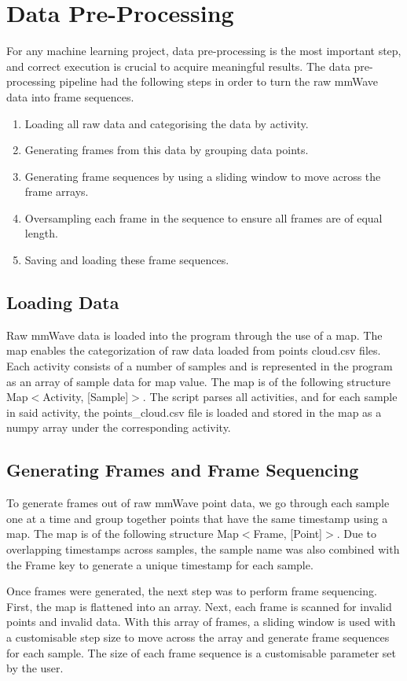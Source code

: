 \section{Data Pre-Processing}
For any machine learning project, data pre-processing is the most important step, and correct execution is crucial to acquire meaningful results. The data pre-processing pipeline had the following steps in order to turn the raw mmWave data into frame sequences.
\begin{enumerate}
    \item Loading all raw data and categorising the data by activity.
    \item Generating frames from this data by grouping data points.
    \item Generating frame sequences by using a sliding window to move across the frame arrays.
    \item Oversampling each frame in the sequence to ensure all frames are of equal length.
    \item Saving and loading these frame sequences.
\end{enumerate}
\subsection{Loading Data}
Raw mmWave data is loaded into the program through the use of a map. The map enables the categorization of raw data loaded from points cloud.csv files. Each activity consists of a number of samples and is represented in the program as an array of sample data for map value. The map is of the following structure Map$<$Activity, [Sample]$>$. The script parses all activities, and for each sample in said activity, the points\_cloud.csv file is loaded and stored in the map as a numpy array under the corresponding activity.

\subsection{Generating Frames and Frame Sequencing}
To generate frames out of raw mmWave point data, we go through each sample one at a time and group together points that have the same timestamp using a map. The map is of the following structure  Map$<$Frame, [Point]$>$. Due to overlapping timestamps across samples, the sample name was also combined with the Frame key to generate a unique timestamp for each sample. 

Once frames were generated, the next step was to perform frame sequencing. First,  the map is flattened into an array. Next, each frame is scanned for invalid points and invalid data. With this array of frames, a sliding window is used with a customisable step size to move across the array and generate frame sequences for each sample. The size of each frame sequence is a customisable parameter set by the user. 

